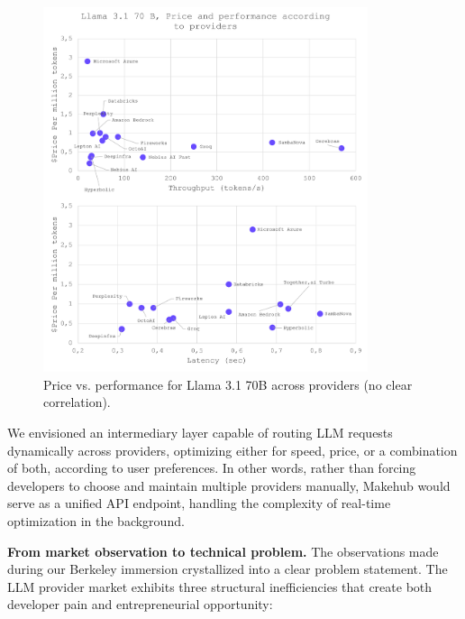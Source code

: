 \documentclass[english]{article}
\begin{document}
\begin{figure}[H]
    \centering
    \includegraphics[width=0.85\textwidth]{images/relation_price_performance_provider_llama3.1_70b.png}
    \caption{Price vs. performance for Llama 3.1 70B across providers (no clear correlation).}
    \label{fig:price_performance_llama}
\end{figure}

We envisioned an intermediary layer capable of routing LLM requests dynamically across providers, optimizing either for speed, price, or a combination of both, according to user preferences.
In other words, rather than forcing developers to choose and maintain multiple providers manually, Makehub would serve as a unified API endpoint, handling the complexity of real-time optimization in the background.

\medskip

\noindent\textbf{From market observation to technical problem.}
The observations made during our Berkeley immersion crystallized into a clear problem statement. The LLM provider market exhibits three structural inefficiencies that create both developer pain and entrepreneurial opportunity:
\end{document}
